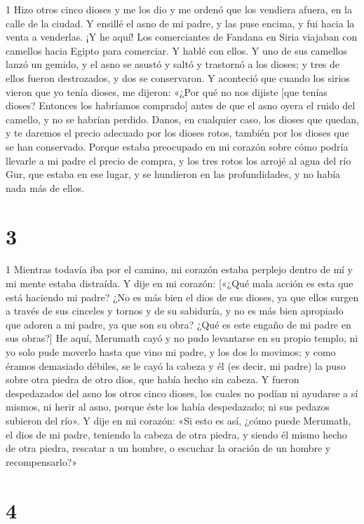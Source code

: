 \par 1 Hizo otros cinco dioses y me los dio y me ordenó que los vendiera afuera, en la calle de la ciudad. Y ensillé el asno de mi padre, y las puse encima, y ​​fui hacia la venta a venderlas. ¡Y he aquí! Los comerciantes de Fandana en Siria viajaban con camellos hacia Egipto para comerciar. Y hablé con ellos. Y uno de sus camellos lanzó un gemido, y el asno se asustó y saltó y trastornó a los dioses; y tres de ellos fueron destrozados, y dos se conservaron. Y aconteció que cuando los sirios vieron que yo tenía dioses, me dijeron: «¿Por qué no nos dijiste [que tenías dioses? Entonces los habríamos comprado] antes de que el asno oyera el ruido del camello, y no se habrían perdido. Danos, en cualquier caso, los dioses que quedan, y te daremos el precio adecuado por los dioses rotos, también por los dioses que se han conservado. Porque estaba preocupado en mi corazón sobre cómo podría llevarle a mi padre el precio de compra, y los tres rotos los arrojé al agua del río Gur, que estaba en ese lugar, y se hundieron en las profundidades, y no había nada más de ellos.

\chapter{3}

\par 1 Mientras todavía iba por el camino, mi corazón estaba perplejo dentro de mí y mi mente estaba distraída. Y dije en mi corazón: [«¿Qué mala acción es esta que está haciendo mi padre? ¿No es más bien el dios de sus dioses, ya que ellos surgen a través de sus cinceles y tornos y de su sabiduría, y no es más bien apropiado que adoren a mi padre, ya que son su obra? ¿Qué es este engaño de mi padre en sus obras?] He aquí, Merumath cayó y no pudo levantarse en su propio templo, ni yo solo pude moverlo hasta que vino mi padre, y los dos lo movimos; y como éramos demasiado débiles, se le cayó la cabeza y él (es decir, mi padre) la puso sobre otra piedra de otro dios, que había hecho sin cabeza. Y fueron despedazados del asno los otros cinco dioses, los cuales no podían ni ayudarse a sí mismos, ni herir al asno, porque éste los había despedazado; ni sus pedazos subieron del río». Y dije en mi corazón: «Si esto es así, ¿cómo puede Merumath, el dios de mi padre, teniendo la cabeza de otra piedra, y siendo él mismo hecho de otra piedra, rescatar a un hombre, o escuchar la oración de un hombre y recompensarlo?»

\chapter{4}

